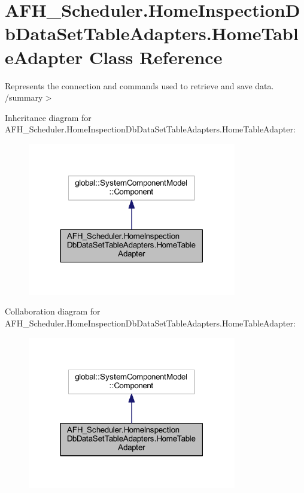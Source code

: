 \section{A\+F\+H\+\_\+\+Scheduler.\+Home\+Inspection\+Db\+Data\+Set\+Table\+Adapters.\+Home\+Table\+Adapter Class Reference}
\label{class_a_f_h___scheduler_1_1_home_inspection_db_data_set_table_adapters_1_1_home_table_adapter}


Represents the connection and commands used to retrieve and save data. /summary$>$  




Inheritance diagram for A\+F\+H\+\_\+\+Scheduler.\+Home\+Inspection\+Db\+Data\+Set\+Table\+Adapters.\+Home\+Table\+Adapter\+:
\nopagebreak
\begin{figure}[H]
\begin{center}
\leavevmode
\includegraphics[width=258pt]{class_a_f_h___scheduler_1_1_home_inspection_db_data_set_table_adapters_1_1_home_table_adapter__inherit__graph}
\end{center}
\end{figure}


Collaboration diagram for A\+F\+H\+\_\+\+Scheduler.\+Home\+Inspection\+Db\+Data\+Set\+Table\+Adapters.\+Home\+Table\+Adapter\+:
\nopagebreak
\begin{figure}[H]
\begin{center}
\leavevmode
\includegraphics[width=258pt]{class_a_f_h___scheduler_1_1_home_inspection_db_data_set_table_adapters_1_1_home_table_adapter__coll__graph}
\end{center}
\end{figure}
